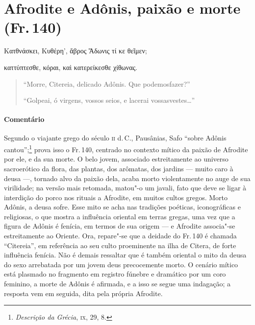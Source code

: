 \section{Afrodite e Adônis, paixão e morte (Fr.\,140)}

\begin{gkverse}
Κατθνάσκει, Κυθέρη’, ἄβρος Ἄδωνις τί κε θεῖμεν;

καττύπτεσθε, κόραι, καὶ κατερείκεσθε χίθωνας.
\end{gkverse}

\begin{verse}
``Morre, Citereia, delicado Adônis. Que podemos\qb{}fazer?''\\

\medskip

``Golpeai, ó virgens, vossos seios, e lacerai vossas\qb{}vestes\ldots{}''
\end{verse}

\medskip

\paragraph{Comentário} Segundo o viajante grego do século \textsc{ii} d.\,C., Pausânias, Safo ``sobre
Adônis cantou'';\footnote{\emph{Descrição da Grécia}, \textsc{ix}, 29, 8.} prova isso o Fr.\,140, 
centrado no contexto mítico da paixão de Afrodite por ele, e da sua morte.
O belo jovem, associado estreitamente ao universo sacroerótico da
flora, das plantas, dos arômatas, dos jardins --- muito caro à deusa ---,
tornado alvo da paixão dela, acaba morto violentamente no auge de sua
virilidade; na versão mais retomada, matou"-o um javali, fato que deve se ligar
à interdição do porco nos rituais a Afrodite, em muitos cultos gregos. Morto
Adônis, a deusa sofre. Esse mito se acha nas tradições poéticas, iconográficas
e religiosas, o que mostra a influência oriental em terras gregas, uma vez que
a figura de Adônis é fenícia, em termos de sua origem --- e Afrodite associa"-se
estreitamente ao Oriente. Ora, repare"-se que a deidade do Fr.\,140 é chamada
``Citereia'', em referência ao seu culto proeminente na ilha de Citera,
de forte influência fenícia.
Não é demais ressaltar que é também oriental o
mito da deusa do sexo arrebatada por um jovem deus precocemente morto. O
cenário mítico está plasmado no fragmento em registro fúnebre e dramático por um coro feminino, a morte de Adônis é afirmada, e a isso
se segue uma indagação; a resposta vem em seguida, dita pela própria Afrodite.

